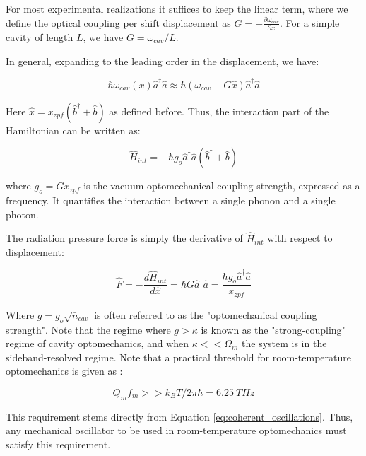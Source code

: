 \documentclass[%
 reprint,
nofootinbib,
 amsmath,amssymb,
 aps,
]{revtex4-2}
\begin{document}
For most experimental realizations it suffices to keep the linear term, where we define the optical coupling per shift displacement as $ G = -\frac{\partial \omega_{cav}}{\partial x} $. For a simple cavity of length $L$, we have $G = \omega_{cav}/L$.
\newline

In general, expanding to the leading order in the displacement, we have:

\begin{equation*}
    \hbar \omega_{cav}(x) \hat{a}^\dagger \hat{a} \approx \hbar (\omega_{cav} - G \hat{x}) \hat{a}^\dagger \hat{a} 
\end{equation*}

Here $\hat{x} = x_{zpf}(\hat{b}^\dagger + \hat{b}) $ as defined before. Thus, the interaction part of the Hamiltonian can be written as:

\begin{equation*}
    \hat{H}_{int} = -\hbar g_o \hat{a}^\dagger \hat{a} (\hat{b}^\dagger + \hat{b} )
\end{equation*}

where $ g_o = G x_{zpf} $ is the vacuum optomechanical coupling strength, expressed as a frequency. It quantifies the interaction between a single phonon and a single photon.
\newline

The radiation pressure force is simply the derivative of $\hat{H}_{int}$ with respect to displacement:

\begin{equation*}
    \hat{F} = -\frac{d\hat{H}_{int}}{d\hat{x}} = \hbar G \hat{a}^\dagger \hat{a} =    \frac{\hbar g_o  \hat{a}^\dagger \hat{a} }{x_{zpf}}
\end{equation*}

Where $g = g_o \sqrt{\bar{n}_{cav}}$ is often referred to as the "optomechanical coupling strength". Note that the regime where $g > \kappa$ is known as the "strong-coupling" regime of cavity optomechanics, and when $\kappa << \Omega_m$ the system is in the sideband-resolved regime. Note that a practical threshold for room-temperature optomechanics is given as \cite{project_paper, cavity_optomechanics_2014}:

\begin{equation*}
    Q_m f_m >> k_B T / 2\pi \hbar = 6.25 \ THz
\end{equation*}

This requirement stems directly from Equation \ref{eq:coherent_oscillations}. Thus, any mechanical oscillator to be used in room-temperature optomechanics must satisfy this requirement.
\end{document}
